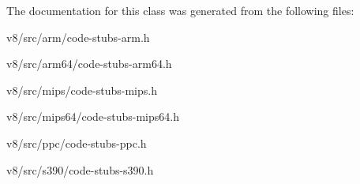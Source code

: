 The documentation for this class was generated from the following files\+:\begin{DoxyCompactItemize}
\item 
v8/src/arm/code-\/stubs-\/arm.\+h\item 
v8/src/arm64/code-\/stubs-\/arm64.\+h\item 
v8/src/mips/code-\/stubs-\/mips.\+h\item 
v8/src/mips64/code-\/stubs-\/mips64.\+h\item 
v8/src/ppc/code-\/stubs-\/ppc.\+h\item 
v8/src/s390/code-\/stubs-\/s390.\+h\end{DoxyCompactItemize}
